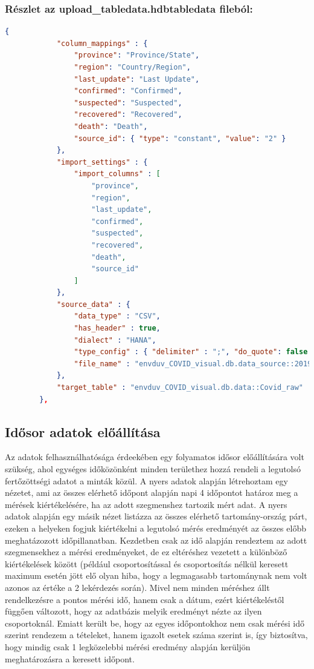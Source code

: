 \documentclass[12pt,a4papaer]{article}
\begin{document}
    \subsubsection{Részlet az upload\_tabledata.hdbtabledata fileból:}
    \begin{lstlisting}[language=json]
        {
            "column_mappings" : { 
                "province": "Province/State",
                "region": "Country/Region",
                "last_update": "Last Update",
                "confirmed": "Confirmed",
                "suspected": "Suspected",
                "recovered": "Recovered",
                "death": "Death",
                "source_id": { "type": "constant", "value": "2" }
            },
            "import_settings" : { 
                "import_columns" : [ 
                    "province",
                    "region",
                    "last_update",
                    "confirmed",
                    "suspected",
                    "recovered",
                    "death",
                    "source_id"
                ]
            },
            "source_data" : {
                "data_type" : "CSV", 
                "has_header" : true, 
                "dialect" : "HANA", 
                "type_config" : { "delimiter" : ";", "do_quote": false },
                "file_name" : "envduv_COVID_visual.db.data_source::2019_nCoV_20200121_20200127.csv"
            },
            "target_table" : "envduv_COVID_visual.db.data::Covid_raw"  
        },
    \end{lstlisting}

    \subsection{Idősor adatok előállítása}
    Az adatok felhasználhatósága érdeekében egy folyamatos idősor előállítására volt szükség, 
    ahol egységes időközönként minden területhez hozzá rendeli a legutolsó fertőzöttségi adatot a minták közül.
    A nyers adatok alapján létrehoztam egy nézetet, ami az összes elérhető időpont alapján napi 4 időpontot 
    határoz meg a mérések kiértékelésére, ha az adott szegmenshez tartozik mért adat.
    A nyers adatok alapján egy másik nézet listázza az összes elérhető tartomány-ország párt, ezeken a helyeken 
    fogjuk kiértékelni a legutolsó mérés eredményét az összes előbb meghatázozott időpillanatban.
    Kezdetben csak az idő alapján rendeztem az adott szegmensekhez a mérési eredményeket, 
    de ez eltéréshez vezetett a különböző kiértékelések között 
    (például csoportosítással és csoportosítás nélkül keresett maximum esetén jött elő olyan hiba, hogy a legmagasabb tartománynak nem volt azonos az értéke a 2 lekérdezés során).
    Mivel nem minden méréshez állt rendelkezésre a pontos mérési idő, hanem csak a dátum, ezért kiértékeléstől függően változott, hogy az adatbázis melyik eredményt nézte az ilyen csoportoknál.
    Emiatt került be, hogy az egyes időpontokhoz nem csak mérési idő szerint rendezem a tételeket, hanem igazolt esetek száma szerint is, 
    így biztosítva, hogy mindig csak 1 legközelebbi mérési eredmény alapján kerüljön meghatározásra a keresett időpont.
\end{document}
